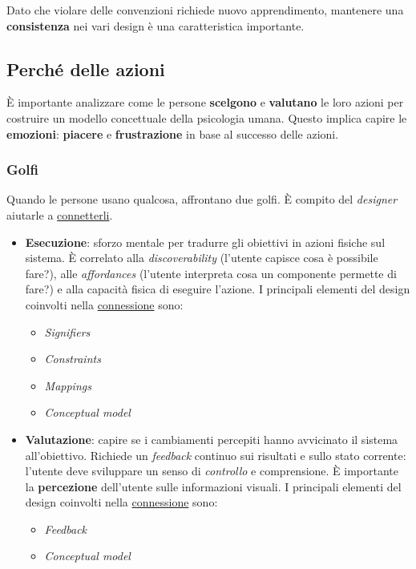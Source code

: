 \begin{note}[Consistenza]
	Dato che violare delle convenzioni richiede nuovo apprendimento, mantenere una \textbf{consistenza} nei vari design è una caratteristica importante.
\end{note}

\newpage
\subsection{Perché delle azioni}
È importante analizzare come le persone \textbf{scelgono} e \textbf{valutano} le loro azioni per costruire un modello concettuale della psicologia umana. Questo implica capire le \textbf{emozioni}: \textbf{piacere} e \textbf{frustrazione} in base al successo delle azioni.

\subsubsection{Golfi}
Quando le persone usano qualcosa, affrontano due golfi. È compito del \textit{designer} aiutarle a \underline{connetterli}.
\begin{itemize}
	\item \textbf{Esecuzione}: sforzo mentale per tradurre gli obiettivi in azioni fisiche sul sistema. È correlato alla \textit{discoverability} (l'utente capisce cosa è possibile fare?), alle \textit{affordances} (l'utente interpreta cosa un componente permette di fare?) e alla capacità fisica di eseguire l'azione. I principali elementi del design coinvolti nella \underline{connessione} sono:
	\begin{itemize}
		\item \textit{Signifiers}
		\item \textit{Constraints}
		\item \textit{Mappings}
		\item \textit{Conceptual model}
	\end{itemize}
	\item \textbf{Valutazione}: capire se i cambiamenti percepiti hanno avvicinato il sistema all'obiettivo. Richiede un \textit{feedback} continuo sui risultati e sullo stato corrente: l'utente deve sviluppare un senso di \textit{controllo} e comprensione. È importante la \textbf{percezione} dell'utente sulle informazioni visuali. I principali elementi del design coinvolti nella \underline{connessione} sono:
	\begin{itemize}
		\item \textit{Feedback}
		\item \textit{Conceptual model}
	\end{itemize}
\end{itemize}

